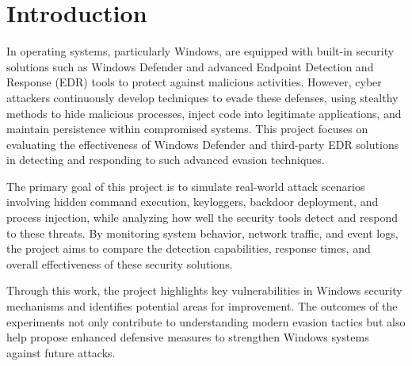 \setcounter{secnumdepth}{-2}

\section{Introduction}

In operating systems, particularly Windows, are equipped with built-in security solutions such as Windows Defender and advanced Endpoint Detection and Response (EDR) tools to protect against malicious activities. However, cyber attackers continuously develop techniques to evade these defenses, using stealthy methods to hide malicious processes, inject code into legitimate applications, and maintain persistence within compromised systems. This project focuses on evaluating the effectiveness of Windows Defender and third-party EDR solutions in detecting and responding to such advanced evasion techniques.

The primary goal of this project is to simulate real-world attack scenarios involving hidden command execution, keyloggers, backdoor deployment, and process injection, while analyzing how well the security tools detect and respond to these threats. By monitoring system behavior, network traffic, and event logs, the project aims to compare the detection capabilities, response times, and overall effectiveness of these security solutions.

Through this work, the project highlights key vulnerabilities in Windows security mechanisms and identifies potential areas for improvement. The outcomes of the experiments not only contribute to understanding modern evasion tactics but also help propose enhanced defensive measures to strengthen Windows systems against future attacks.



